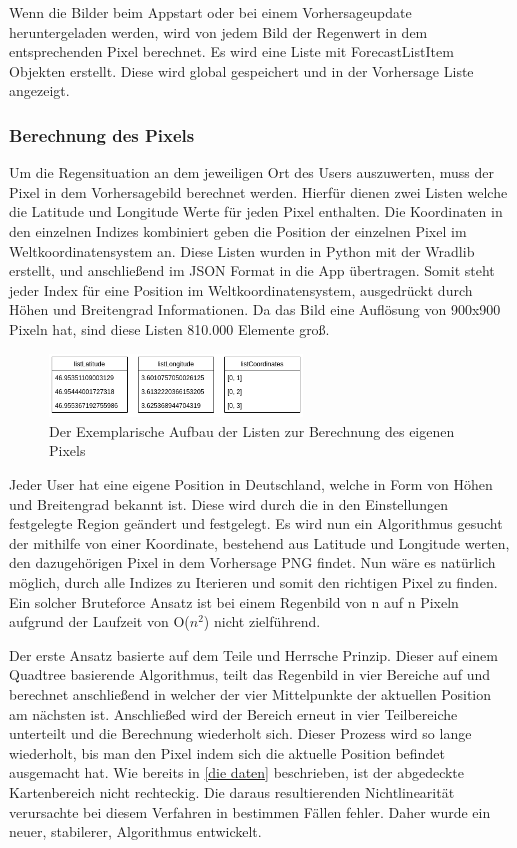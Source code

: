 Wenn die Bilder beim Appstart oder bei einem Vorhersageupdate heruntergeladen werden, wird von jedem Bild der Regenwert 
in dem entsprechenden Pixel berechnet. 
Es wird eine Liste mit ForecastListItem Objekten erstellt. Diese wird global gespeichert und in der Vorhersage Liste angezeigt. 

\subsubsection{Berechnung des Pixels} \label{sec: pixel_berechnung}
Um die Regensituation an dem jeweiligen Ort des Users auszuwerten, muss der Pixel in dem Vorhersagebild berechnet werden. 
Hierfür dienen zwei Listen welche die Latitude und Longitude Werte für jeden Pixel enthalten. 
Die Koordinaten in den einzelnen Indizes kombiniert geben die Position der einzelnen Pixel im Weltkoordinatensystem an.
Diese Listen wurden in Python mit der Wradlib erstellt, und anschließend im JSON Format in die App übertragen. 
Somit steht jeder Index für eine Position im Weltkoordinatensystem, ausgedrückt durch Höhen und Breitengrad Informationen.
Da das Bild eine Auflösung von 900x900 Pixeln hat, sind diese Listen 810.000 Elemente groß.
\begin{figure}[H]
  \centering
  \includegraphics[width=0.6\textwidth,angle=0]{abb/listen_pixel_berechnung.png}
  \caption{Der Exemplarische Aufbau der Listen zur Berechnung des eigenen Pixels}
 \label{fig:sequence_diagram_app_start}
 \end{figure}
 \noindent 
 Jeder User hat eine eigene Position in Deutschland, welche in Form von Höhen und Breitengrad bekannt ist. 
 Diese wird durch die in den Einstellungen festgelegte Region geändert und festgelegt. 
 Es wird nun ein Algorithmus gesucht der mithilfe von einer Koordinate, bestehend aus Latitude und Longitude werten, den dazugehörigen Pixel in dem Vorhersage PNG findet. 
 Nun wäre es natürlich möglich, durch alle Indizes zu Iterieren und somit den richtigen Pixel zu finden.
 Ein solcher Bruteforce Ansatz ist bei einem Regenbild von n auf n Pixeln aufgrund der Laufzeit von O($n^2$) nicht zielführend.

 \noindent 
 Der erste Ansatz basierte auf dem Teile und Herrsche Prinzip. 
 Dieser auf einem Quadtree basierende Algorithmus, teilt das Regenbild in vier Bereiche auf und berechnet anschließend in welcher der vier Mittelpunkte der aktuellen Position am nächsten ist. 
 Anschließed wird der Bereich erneut in vier Teilbereiche unterteilt und die Berechnung wiederholt sich. 
 Dieser Prozess wird so lange wiederholt, bis man den Pixel indem sich die aktuelle Position befindet ausgemacht hat.
 Wie bereits in \ref{die daten} beschrieben, ist der abgedeckte Kartenbereich nicht rechteckig. 
 Die daraus resultierenden Nichtlinearität verursachte bei diesem Verfahren in bestimmen Fällen fehler. 
 Daher wurde ein neuer, stabilerer, Algorithmus entwickelt. 
 
